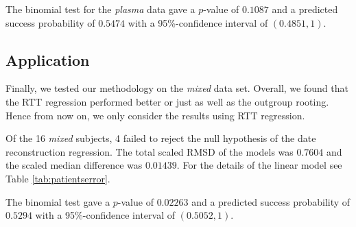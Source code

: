 \documentclass[12pt]{article}
\begin{document}
The {binomial test} for the \emph{plasma} data gave a $p$-value of $0.1087$ and a predicted success probability of $0.5474$ with a 95\%-confidence interval of $(0.4851, 1)$.

\subsection * {Application} \label{sec:mixed_data}




Finally, we tested our methodology on the {\em mixed} data set.
Overall, we found that the RTT regression performed better or just as well as the outgroup rooting.
Hence from now on, we only consider the results using RTT regression.

Of the 16 \emph{mixed} subjects, 4 failed to reject the null hypothesis of the date reconstruction regression.
The total scaled RMSD of the models was $0.7604$ and the scaled median difference was $0.01439$.
For the details of the linear model see Table \ref{tab:patientserror}.

The {binomial test} gave a $p$-value of $0.02263$ and a predicted success probability of $0.5294$ with a 95\%-confidence interval of $(0.5052, 1)$.

\end{document}
